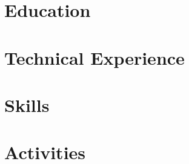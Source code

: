 \documentclass[letter,10pt]{article}
\begin{document}


\section{Education}


\section{Technical Experience}


\section{Skills}




\section{Activities}

\end{document}
